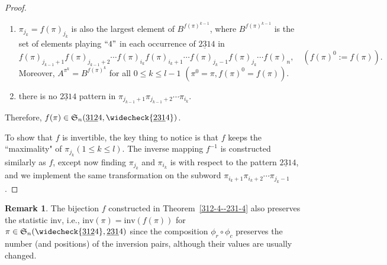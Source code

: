 \documentclass[11pt,reqno]{amsart}
\numberwithin{equation}{section}
\theoremstyle{plain}
\theoremstyle{definition}
\newtheorem{remark}[theorem]{Remark}
\renewcommand{\S}{\mathfrak{S}}
\def\inv{\mathrm{inv}}
\begin{document}
\begin{proof}
\begin{enumerate}[label=(\roman*)]
      \item $\pi_{j_k}=f(\pi)_{j_k}$ is also the largest element of $B^{f(\pi)^{k-1}}$, where
      $B^{f(\pi)^{k-1}}$ is        
      the set of elements playing $``4"$ in each occurrence of $\underline{231}4$ in
      $$f(\pi)_{j_{k-1}+1}f(\pi)_{j_{k-1}+2}\cdots f(\pi)_{i_k} f(\pi)_{i_k+1}\cdots f(\pi)_{j_k-1} f(\pi)_{j_k}\cdots f(\pi)_n,\quad (f(\pi)^0:=f(\pi)).
      $$
      Moreover, $A^{\pi^k}=B^{f(\pi)^{k}}$ for all $0\le k \le l-1$ $(\pi^0=\pi,f(\pi)^{0}=f(\pi))$.
      \item there is no $\underline{231}4$ pattern in $\pi_{j_{k-1}+1}\pi_{j_{k-1}+2}\cdots \pi_{i_{k}}$.
  \end{enumerate}
  Therefore, $f(\pi)\in \S_n(\underline{312}4,\widecheck{\underline{231}4})$.

  To show that $f$ is invertible, the key thing to notice is that $f$ keeps the ``maximality" of $\pi_{j_k}(1\le k \le l)$. The inverse mapping $f^{-1}$ is constructed similarly as $f$, except now finding $\pi_{j_k}$ and $\pi_{i_k}$ is with respect to the pattern $\underline{231}4$,
  and we implement the same transformation on the subword $\pi_{i_k+1}\pi_{i_k+2}\cdots \pi_{j_{k}-1}$.
\end{proof}

\begin{remark}
  The bijection $f$ constructed in Theorem~\ref{312-4--231-4} also preserves the statistic $\inv $,
  i.e., $\inv (\pi)=\inv (f(\pi))$ for $\pi \in \S_n(\widecheck{\underline{312}4},\underline{231}4)$ since the composition $\phi_r\circ\phi_c$ preserves the number (and positions) of the inversion pairs, although their values are usually changed.
\end{remark}
\end{document}
